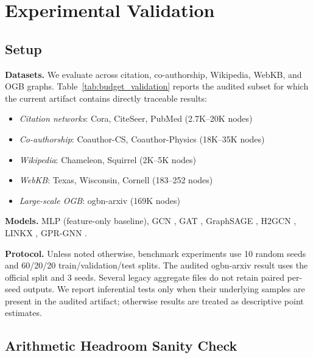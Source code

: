 
\section{Experimental Validation}
\label{sec:experiments}

\subsection{Setup}

\textbf{Datasets.} We evaluate across citation, co-authorship, Wikipedia, WebKB, and OGB graphs. Table~\ref{tab:budget_validation} reports the audited subset for which the current artifact contains directly traceable results:
\begin{itemize}
    \item \textit{Citation networks}: Cora, CiteSeer, PubMed (2.7K--20K nodes)
    \item \textit{Co-authorship}: Coauthor-CS, Coauthor-Physics (18K--35K nodes)
    \item \textit{Wikipedia}: Chameleon, Squirrel (2K--5K nodes)
    \item \textit{WebKB}: Texas, Wisconsin, Cornell (183--252 nodes)
    \item \textit{Large-scale OGB}: ogbn-arxiv (169K nodes)
\end{itemize}

\textbf{Models.} MLP (feature-only baseline), GCN \cite{kipf2017gcn}, GAT \cite{velivckovic2018gat}, GraphSAGE \cite{hamilton2017graphsage}, H2GCN \cite{zhu2020beyond}, LINKX \cite{lim2021large}, GPR-GNN \cite{chien2021gprgnn}.

\textbf{Protocol.} Unless noted otherwise, benchmark experiments use 10 random seeds and 60/20/20 train/validation/test splits. The audited ogbn-arxiv result uses the official split and 3 seeds. Several legacy aggregate files do not retain paired per-seed outputs. We report inferential tests only when their underlying samples are present in the audited artifact; otherwise results are treated as descriptive point estimates.

\subsection{Arithmetic Headroom Sanity Check}

